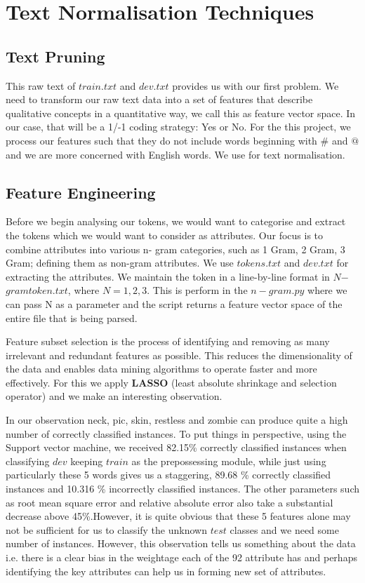 \section{Text Normalisation Techniques}
\label{sec-background}

\subsection{Text Pruning}
This raw text of $train.txt$ and $dev.txt$ provides us with our first problem. We need to transform our raw text data into a set of features that describe qualitative concepts in a quantitative way, we call this as feature vector space. In our case, that will be a 1/-1 coding strategy: Yes or No. For the this project, we process our features such that they do not include words beginning with {\#} and {$@$} and we are more concerned with English words. We use {\citet{gm14}} for text normalisation.



\subsection{Feature Engineering}
Before we begin analysing our tokens, we would want to categorise and extract the tokens which we would want to consider as attributes. Our focus is to combine attributes into various n- gram categories, such as 1 Gram, 2 Gram, 3 Gram; defining them as non-gram attributes. We use $tokens.txt$ and $dev.txt$ for extracting the attributes. We maintain the token in a line-by-line format in $N$$-$$gramtoken.txt$, where ${N=1,2,3}$. This is perform in the $n-gram.py$ where we can pass N as a parameter and the script returns a feature vector space of the entire file that is being parsed. 

Feature subset selection is the process of identifying and removing as many irrelevant and redundant features as possible. This reduces the dimensionality of the data and enables data mining algorithms to operate faster and more effectively.
For this we apply \textbf{LASSO} ({least absolute shrinkage and selection operator}) and we make an interesting observation. 

In our observation {neck, pic, skin, restless and zombie} can produce quite a high number of correctly classified instances. To put things in perspective, using the Support vector machine, we received 82.15\% correctly classified instances when classifying $dev$ keeping $train$ as the prepossessing module, while just using particularly these 5 words gives us a staggering, 89.68 \% correctly classified instances and 10.316 \% incorrectly classified instances. The other parameters such as root mean square error and relative absolute error also take a substantial decrease above 45\%.However, it is quite obvious that these 5 features alone may not be sufficient for us to classify the unknown $test$ classes and we need some number of instances. However, this observation tells us something about the data i.e. there is a clear bias in the weightage each of the 92 attribute has and perhaps identifying the key attributes can help us in forming new set of attributes. 


